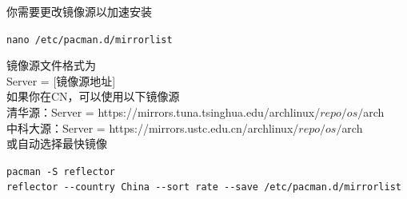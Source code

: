 \documentclass{article}
\newenvironment{singlecolumn}{%
	\par
	\noindent
	\begin{minipage}[t]{\textwidth}
		\setlength{\parfillskip}{0pt plus 1fil}
	}{%
	\end{minipage}
	\par
}
\begin{document}
\begin{singlecolumn}
你需要更改镜像源以加速安装\\
\begin{tcolorbox}[
	title=bash,
	boxrule=1pt,
	fonttitle=\bfseries,
	listing only, 
	listing options={language=bash}
	]
	\verb|nano /etc/pacman.d/mirrorlist|\\
\end{tcolorbox}
镜像源文件格式为\\
\textcolor{code}{Server = [镜像源地址]}\\
如果你在CN，可以使用以下镜像源\\
清华源：\textcolor{code}{Server = https://mirrors.tuna.tsinghua.edu/archlinux/$repo/os/$arch}\\
中科大源：\textcolor{code}{Server = https://mirrors.ustc.edu.cn/archlinux/$repo/os/$arch}\\
或自动选择最快镜像\\
\begin{tcolorbox}[
	title=bash,
	boxrule=1pt,
	fonttitle=\bfseries,
	listing only, 
	listing options={language=bash}
	]
	\verb|pacman -S reflector|\\
	\verb|reflector --country China --sort rate --save /etc/pacman.d/mirrorlist|\\
\end{tcolorbox}

\medskip

\end{singlecolumn}
\pagebreak
\end{document}
